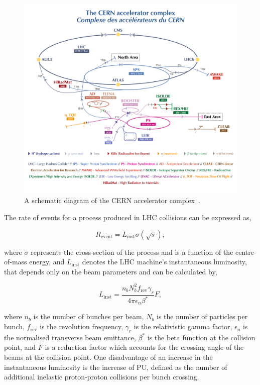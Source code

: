 \begin{figure}[t]
    \centering
    \includegraphics[width=\textwidth]{Figures/cern.png}
    \caption[Diagram of the CERN accelerator complex.]{A schematic diagram of the CERN accelerator complex~\cite{Bartosik:2847538}.}
    \label{fig:CERN_Schematic}
\end{figure}

The rate of events for a process produced in \ac{LHC} collisions can be expressed as,

\begin{equation}
R_{\text{event}} = L_{\text{inst}} \sigma(\sqrt{s}), 
\end{equation}

where $\sigma$ represents the cross-section of the process and is a function of the centre-of-mass energy, and $L_{\text{inst}}$ denotes the \ac{LHC} machine's instantaneous luminosity, that depends only on the beam parameters and can be calculated by,

\begin{equation}
L_{\text{inst}} = \frac{n_{b}N_{b}^{2}f_{\text{rev}}\gamma_{r}}{4\pi \epsilon_{n}\beta^{*}}F,
\end{equation}

where $n_b$ is the number of bunches per beam, $N_b$ is the number of particles per bunch, $f_{\text{rev}}$ is the revolution frequency, $\gamma_r$ is the relativistic gamma factor, $\epsilon_n$ is the normalised transverse beam emittance, $\beta^*$ is the beta function at the collision point, and $F$ is a reduction factor which accounts for the crossing angle of the beams at the collision point. 
One disadvantage of an increase in the instantaneous luminosity is the increase of \ac{PU}, defined as the number of additional inelastic proton-proton collisions per bunch crossing.

